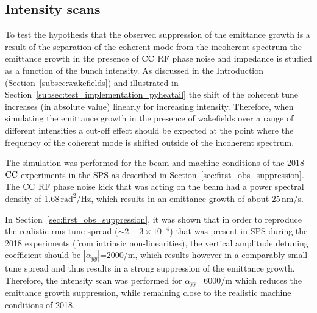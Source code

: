 \subsection{Intensity scans}\label{subsec:intensity_scan_emit_growth}
To test the hypothesis that the observed suppression of the emittance growth is a result of the separation of the coherent mode from the incoherent spectrum the emittance growth in the presence of ${\mathrm{CC}}$ RF phase noise and impedance is studied as a function of the bunch intensity. As discussed in the Introduction (Section~\ref{subsec:wakefields}) and illustrated in Section~\ref{subsec:test_implementation_pyheatail} the shift of the coherent tune increases (in absolute value) linearly for increasing intensity. Therefore, when simulating the emittance growth in the presence of wakefields over a range of different intensities a cut-off effect should be expected at the point where the frequency of the coherent mode is shifted outside of the incoherent spectrum.

The simulation was performed for the beam and machine conditions of the 2018 ${\mathrm{CC}}$ experiments in the SPS as described in Section~\ref{sec:first_obs_suppression}. The ${\mathrm{CC}}$ RF phase noise kick that was acting on the beam had a power spectral density of 1.68\,$\mathrm{rad^2/Hz}$, which results in an emittance growth of about 25\,nm/s. 

In Section~\ref{sec:first_obs_suppression}, it was shown that in order to reproduce the realistic rms tune spread ($\sim 2-3 \times 10^{-4}$) that was present in SPS during the 2018 experiments (from intrinsic non-linearities), the vertical amplitude detuning coefficient should be $| \alpha_{yy} |$=2000/m, which results however in a comparably small tune spread and thus results in a strong suppression of the emittance growth. Therefore, the intensity scan was performed for $\alpha_\mathrm{yy}$=6000/m which reduces the emittance growth suppression, while remaining close to the realistic machine conditions of 2018.


